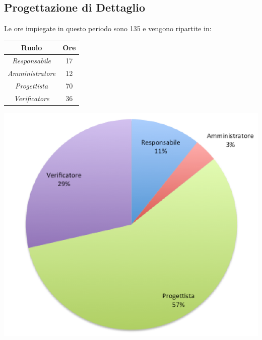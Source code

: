 \subsection{Progettazione di Dettaglio}
Le ore impiegate in questo periodo sono 135 e vengono ripartite in:
\begin{center}
  \centering
  \begin{tabular}{|c|c|}
    \hline
    \textbf{Ruolo} & \textbf{Ore} \\
    \hline
     \emph{Responsabile}  & 17 \\
    \hline  \emph{Amministratore}  & 12 \\
    \hline  \emph{Progettista}  & 70 \\
    \hline  \emph{Verificatore}  & 36 \\
    \hline
  \end{tabular}
  \includegraphics[scale=0.7]{img/grafico4.png}
\end{center}

